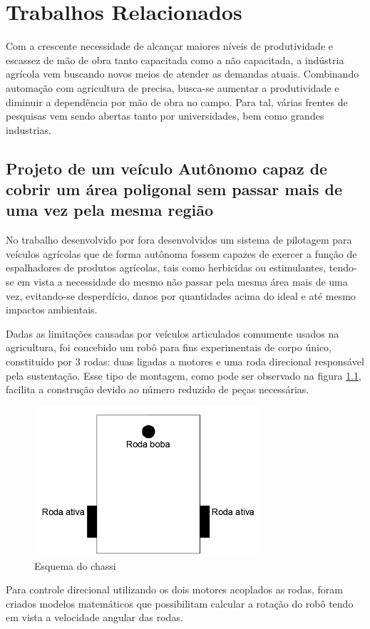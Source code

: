 \chapter{Trabalhos Relacionados}
\label{cap:trabalhos:relacionados}
Com a crescente necessidade de alcançar maiores níveis de produtividade e escassez de mão de obra tanto capacitada como a não capacitada, a indústria agrícola vem buscando novos meios de atender as demandas atuais. Combinando automação com agricultura de precisa, busca-se aumentar a produtividade e diminuir a dependência por mão de obra no campo. Para tal, várias frentes de pesquisas vem sendo abertas tanto por universidades, bem como grandes industrias. 

\section{Projeto de um veículo Autônomo capaz de cobrir um área poligonal sem passar mais de uma vez pela mesma região}
No trabalho desenvolvido por \cite{bracht:2015} fora desenvolvidos um sistema de pilotagem para veículos agrícolas que de forma autônoma fossem capazes de exercer a função de espalhadores de produtos agrícolas, tais como herbicidas ou estimulantes, tendo-se em vista a necessidade do mesmo não passar pela mesma área mais de uma vez, evitando-se desperdício, danos por quantidades acima do ideal e até mesmo impactos ambientais.

Dadas as limitações causadas por veículos articulados comumente usados na agricultura, foi concebido um robô para fins experimentais de corpo único, constituído por 3 rodas: duas ligadas a motores e uma roda direcional responsável pela sustentação. Esse tipo de montagem, como pode ser observado na figura \ref{fig:chassi:robo}, facilita a construção devido ao número reduzido de peças necessárias.
\begin{figure}[H]
    \centering
    \includegraphics[width=0.75\textwidth]{figuras/robo bach.png}
    \caption{Esquema do chassi}
    \label{fig:chassi:robo}
\end{figure}
Para controle direcional utilizando os dois motores acoplados as rodas, foram criados modelos matemáticos que possibilitam calcular a rotação do robô tendo em vista a velocidade angular das rodas.

